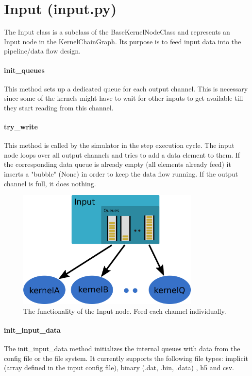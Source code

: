 \section{Input (input.py)}
The Input class is a subclass of the BaseKernelNodeClass and represents an Input node in the KernelChainGraph. Its purpose is to feed input data into the pipeline/data flow design. 


\paragraph{init\_queues}
This method sets up a dedicated queue for each output channel. This is necessary since some of the kernels might have to wait for other inputs to get available till they start reading from this channel.


\paragraph{try\_write}
This method is called by the simulator in the step execution cycle. The input node loops over all output channels and tries to add a data element to them. If the corresponding data queue is already empty (all elements already feed) it inserts a "bubble" (None) in order to keep the data flow running. If the output channel is full, it does nothing. 
\begin{figure}[h]
	\centering
	\includegraphics[height=16em]{drawings/inputs-multi-queue.png}
	\caption{The functionality of the Input node. Feed each channel individually.}
	\label{fig:inputs-multi-queue}
\end{figure}


\paragraph{init\_input\_data}
The init\_input\_data method initializes the internal queues with data from the config file or the file system. It currently supports the following file types: implicit (array defined in the input config file), binary (.dat, .bin, .data) , h5 and csv.







